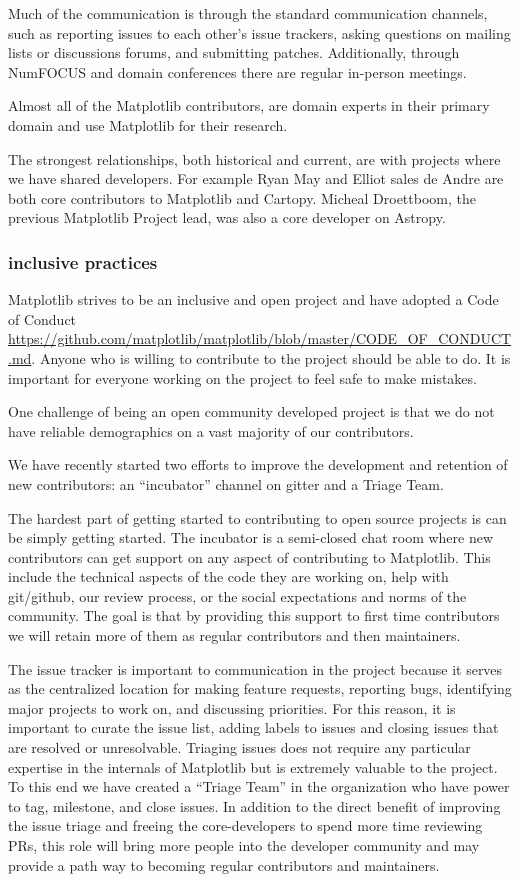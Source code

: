 \documentclass[12pt]{article}
\numberwithin{page}{section}
\begin{document}
Much of the communication is through the standard communication
channels, such as reporting issues to each other's issue trackers,
asking questions on mailing lists or discussions forums, and
submitting patches.  Additionally, through NumFOCUS and domain
conferences there are regular in-person meetings.

Almost all of the Matplotlib contributors, are domain experts in their
primary domain and use Matplotlib for their research.

The strongest relationships, both historical and current, are with
projects where we have shared developers.  For example Ryan May and
Elliot sales de Andre are both core contributors to Matplotlib and
Cartopy.  Micheal Droettboom, the previous Matplotlib Project lead,
was also a core developer on Astropy.



\subsubsection{inclusive practices}

Matplotlib strives to be an inclusive and open project and have
adopted a Code of Conduct
\url{https://github.com/matplotlib/matplotlib/blob/master/CODE_OF_CONDUCT.md}. Anyone
who is willing to contribute to the project should be able to do.  It
is important for everyone working on the project to feel safe to make
mistakes.

One challenge of being an open community developed project is that we do not
have reliable demographics on a vast majority of our contributors.

We have recently started two efforts to improve the development and
retention of new contributors: an ``incubator'' channel on gitter and
a Triage Team.

The hardest part of getting started to contributing to open source
projects is can be simply getting started.  The incubator is a
semi-closed chat room where new contributors can get support on any
aspect of contributing to Matplotlib.  This include the technical
aspects of the code they are working on, help with git/github, our
review process, or the social expectations and norms of the community.  The
goal is that by providing this support to first time contributors we will
retain more of them as regular contributors and then maintainers.

The issue tracker is important to communication in the project because
it serves as the centralized location for making feature requests,
reporting bugs, identifying major projects to work on, and discussing
priorities.  For this reason, it is important to curate the issue
list, adding labels to issues and closing issues that are resolved or
unresolvable. Triaging issues does not require any particular
expertise in the internals of Matplotlib but is extremely valuable to
the project.  To this end we have created a ``Triage Team'' in the
organization who have power to tag, milestone, and close issues.  In
addition to the direct benefit of improving the issue triage and
freeing the core-developers to spend more time reviewing PRs, this
role will bring more people into the developer community and may
provide a path way to becoming regular contributors and maintainers.
\end{document}
